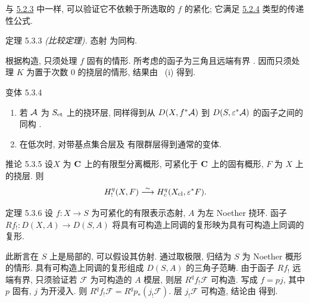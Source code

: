 与 \hyperref[XVII.lem5.2.3]{5.2.3} 中一样, 可以验证它不依赖于所选取的 $f$ 的紧化; 它满足 \hyperref[XVII.lem5.2.4]{5.2.4} 类型的传递性公式.

\begin{enonce*}{定理 5.3.3}
\emph{(比较定理).} 态射  为同构.
\end{enonce*}

根据构造, 只须处理 $f$ 固有的情形. 所考虑的函子为三角且远端有界 \cite[I 7]{sga4.exp.XVII.bib.RD}. 因而只须处理 $K$ 为置于次数 $0$ 的挠层的情形, 结果由 ~(i) 得到.

\begin{enonce*}[remark]{变体 5.3.4}
\begin{enumerate}
\renewcommand{\theenumi}{\roman{enumi}}
\renewcommand{\labelenumi}{(\theenumi)}
\item 若 ${\mathcal A}$ 为 $S_{\text{\rm et}}$ 上的挠环层, 同样得到从 $D(X,f^{\ast}{\mathcal A})$ 到 $D(S,\varepsilon^{\ast}{\mathcal A})$ 的函子之间的同构 .

\item 在低次时, 对带基点集合层及 \iInd 有限群层得到通常的变体.
\end{enumerate}
\end{enonce*}

\begin{enonce*}{推论 5.3.5}
设\pageoriginale $X$ 为 $\mathbf{C}$ 上的有限型分离概形, 可紧化于 $\mathbf{C}$ 上的固有概形, $F$ 为 $X$ 上的挠层. 则
$$
H^{q}_{!}(X,F)\overset{\sim}{\longrightarrow} H^{q}_c(X_{\operatorname{cl}},\varepsilon^{\ast}F){}.
$$
\end{enonce*}

\begin{enonce*}{定理 5.3.6}
设 $f:X\rightarrow S$ 为可紧化的有限表示态射, $A$ 为左 Noether 挠环. 函子 $Rf_{!}:D(X,A)\rightarrow D(S,A)$ 将具有可构造上同调的复形映为具有可构造上同调的复形.
\end{enonce*}

此断言在 $S$ 上是局部的, 可以假设其仿射. 通过取极限, 归结为 $S$ 为 Noether 概形的情形. 具有可构造上同调的复形组成 $D(S,A)$ 的三角子范畴. 由于函子 $Rf_{!}$ 远端有界, 只须验证若 $\mathcal F$ 为可构造的 $A$ 模层, 则层 $R^qf_{!}\mathcal F$ 可构造. 写成 $f=pj$, 其中 $p$ 固有, $j$ 为开浸入. 则 $R^qf_{!}\mathcal F=R^qp_{\ast}(j_{!}\mathcal F)$. 层 $j_{!}\mathcal F$ 可构造, 结论由  得到.

